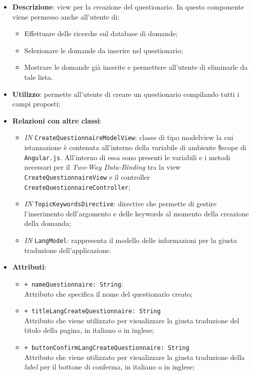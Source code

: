 \begin{itemize}
	\item \textbf{Descrizione}: view per la creazione del questionario. In questo componente viene permesso anche all'utente di:
	\begin{itemize}
		\item Effettuare delle ricerche sul database di domande;
		\item Selezionare le domande da inserire nel questionario;
		\item Mostrare le domande già inserite e permettere all'utente di eliminarle da tale lista.
	\end{itemize}
	\item \textbf{Utilizzo}: permette all'utente di creare un questionario compilando tutti i campi proposti;
	\item \textbf{Relazioni con altre classi}:
	\begin{itemize}
		\item \textit{IN} \texttt{CreateQuestionnaireModelView}: classe di tipo modelview la cui istanzazione è contenuta all'interno della variabile di ambiente \$scope di \texttt{Angular.js}. All'interno di essa sono presenti le variabili e i metodi necessari per il \textit{Two-Way Data-Binding} tra la view \texttt{CreateQuestionnaireView} e il controller \texttt{CreateQuestionnaireController};
		\item \textit{IN} \texttt{TopicKeywordsDirective}: directive che permette di gestire l'inserimento dell'argomento e delle keywords al momento della creazione della domanda;
		\item \textit{IN} \texttt{LangModel}: rappresenta il modello delle informazioni per la giusta traduzione dell'applicazione.
	\end{itemize}
		\item \textbf{Attributi}:
		\begin{itemize}
			\item \texttt{+ nameQuestionnaire: String}: \\ Attributo che specifica il nome del questionario creato;
			\item \texttt{+ titleLangCreateQuestionnaire: String} \\ Attributo che viene utilizzato per visualizzare la giusta traduzione del titolo della pagina, in italiano o in inglese;
			\item \texttt{+ buttonConfirmLangCreateQuestionnaire: String} \\ Attributo che viene utilizzato per visualizzare la giusta traduzione della \textit{label} per il bottone di conferma, in italiano o in inglese;

\end{itemize}
\end{itemize}

